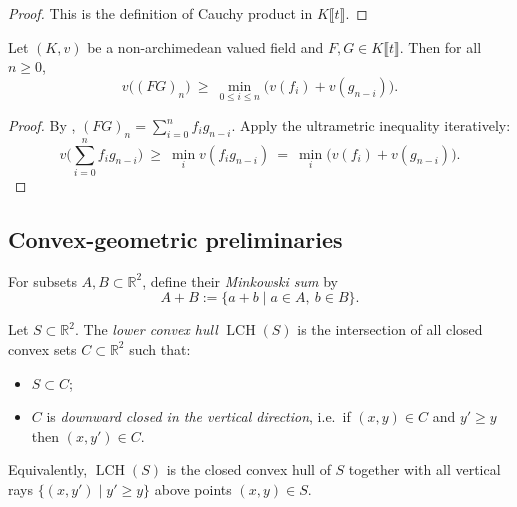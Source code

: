 \begin{proof}
 
  \leanok
  This is the definition of Cauchy product in $K\llbracket t\rrbracket$.
\end{proof}

\begin{lemma}
  \label{lem:vp_coeff_mul_lower_bound}
  
  \leanok
  
  
  Let $(K,v)$ be a non-archimedean valued field and $F,G\in K\llbracket t\rrbracket$.
  Then for all $n\ge 0$,
  \[
    v\big((FG)_n\big)\ \ge\ \min_{0\le i\le n}\big(v(f_i)+v(g_{n-i})\big).
  \]
\end{lemma}

\begin{proof}
 
  By , $(FG)_n=\sum_{i=0}^n f_i g_{n-i}$.
  Apply the ultrametric inequality iteratively:
  \[
    v\Big(\sum_{i=0}^n f_i g_{n-i}\Big)\ \ge\ \min_i v(f_i g_{n-i})
    \ =\ \min_i \big(v(f_i)+v(g_{n-i})\big).
  \]
\end{proof}

\subsection{Convex-geometric preliminaries}

\begin{definition}
  \label{def:minkowski_sum}
  
  \uses{}
  \leanok
  
  
  For subsets $A,B\subset \mathbb{R}^2$, define their \emph{Minkowski sum} by
  \[
    A+B := \{a+b \mid a\in A,\ b\in B\}.
  \]
\end{definition}

\begin{definition}
  \label{def:lower_convex_hull}
  
  \uses{}
  \leanok
  
  
  Let $S\subset \mathbb{R}^2$.
  The \emph{lower convex hull} $\operatorname{LCH}(S)$ is the intersection of all closed convex sets
  $C\subset\mathbb{R}^2$ such that:
  \begin{itemize}
    \item $S\subset C$;
    \item $C$ is \emph{downward closed in the vertical direction}, i.e.\ if $(x,y)\in C$ and $y'\ge y$ then $(x,y')\in C$.
  \end{itemize}
  Equivalently, $\operatorname{LCH}(S)$ is the closed convex hull of $S$ together with all vertical rays
  $\{(x,y')\mid y'\ge y\}$ above points $(x,y)\in S$.
\end{definition}

